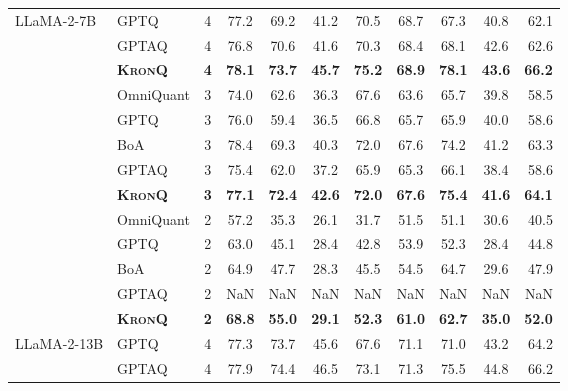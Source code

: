 \documentclass{article} %
\newcommand{\KronQ}{\textsc{KronQ}}
\begin{document}
\begin{longtable}{l||l|c|cccccccr}
\multirow{13}{*}{LLaMA-2-7B}
 & GPTQ  & 4 & 77.2 & 69.2 & 41.2 & 70.5 & 68.7 & 67.3 & 40.8 & 62.1 \\
 & GPTAQ & 4 & 76.8 & 70.6 & 41.6 & 70.3 & 68.4 & 68.1 & 42.6 & 62.6 \\
 & \cellcolor{gray!15}\textbf{\KronQ} & \cellcolor{gray!15}\textbf{4} & \cellcolor{gray!15}\textbf{78.1} & \cellcolor{gray!15}\textbf{73.7} & \cellcolor{gray!15}\textbf{45.7} & \cellcolor{gray!15}\textbf{75.2} & \cellcolor{gray!15}\textbf{68.9} & \cellcolor{gray!15}\textbf{78.1} & \cellcolor{gray!15}\textbf{43.6} & \cellcolor{gray!15}\textbf{66.2} \\
\cline{2-11}
 & OmniQuant & 3 & 74.0 & 62.6 & 36.3 & 67.6 & 63.6 & 65.7 & 39.8 & 58.5 \\
 & GPTQ      & 3 & 76.0 & 59.4 & 36.5 & 66.8 & 65.7 & 65.9 & 40.0 & 58.6 \\
 & BoA       & 3 & 78.4 & 69.3 & 40.3 & 72.0 & 67.6 & 74.2 & 41.2 & 63.3 \\
 & GPTAQ     & 3 & 75.4 & 62.0 & 37.2 & 65.9 & 65.3 & 66.1 & 38.4 & 58.6 \\
 & \cellcolor{gray!15}\textbf{\KronQ} & \cellcolor{gray!15}\textbf{3} & \cellcolor{gray!15}\textbf{77.1} & \cellcolor{gray!15}\textbf{72.4} & \cellcolor{gray!15}\textbf{42.6} & \cellcolor{gray!15}\textbf{72.0} & \cellcolor{gray!15}\textbf{67.6} & \cellcolor{gray!15}\textbf{75.4} & \cellcolor{gray!15}\textbf{41.6} & \cellcolor{gray!15}\textbf{64.1} \\
\cline{2-11}
 & OmniQuant & 2 & 57.2 & 35.3 & 26.1 & 31.7 & 51.5 & 51.1 & 30.6 & 40.5 \\
 & GPTQ      & 2 & 63.0 & 45.1 & 28.4 & 42.8 & 53.9 & 52.3 & 28.4 & 44.8 \\
 & BoA       & 2 & 64.9 & 47.7 & 28.3 & 45.5 & 54.5 & 64.7 & 29.6 & 47.9 \\
 & GPTAQ     & 2 & NaN & NaN & NaN & NaN & NaN & NaN & NaN & NaN \\
 & \cellcolor{gray!15}\textbf{\KronQ} & \cellcolor{gray!15}\textbf{2} & \cellcolor{gray!15}\textbf{68.8} & \cellcolor{gray!15}\textbf{55.0} & \cellcolor{gray!15}\textbf{29.1} & \cellcolor{gray!15}\textbf{52.3} & \cellcolor{gray!15}\textbf{61.0} & \cellcolor{gray!15}\textbf{62.7} & \cellcolor{gray!15}\textbf{35.0} & \cellcolor{gray!15}\textbf{52.0} \\
\hline
\multirow{13}{*}{LLaMA-2-13B}
 & GPTQ  & 4 & 77.3 & 73.7 & 45.6 & 67.6 & 71.1 & 71.0 & 43.2 & 64.2 \\
 & GPTAQ & 4 & 77.9 & 74.4 & 46.5 & 73.1 & 71.3 & 75.5 & 44.8 & 66.2 \\

\end{longtable}
\end{document}
